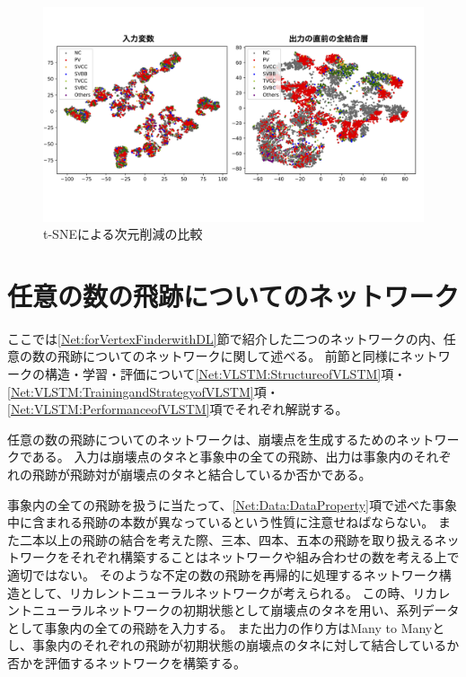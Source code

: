 \begin{figure}[htbp]
 \centering
 \includegraphics[width=1.0\textwidth]{Figure/3Networks/3-3-3-3tSNE.png}
 \caption{t-SNEによる次元削減の比較}
 \label{3-3-3-3tSNE}
\end{figure}



\section{任意の数の飛跡についてのネットワーク} \label{Net:VertexLSTM}

ここでは\ref{Net:forVertexFinderwithDL}節で紹介した二つのネットワークの内、任意の数の飛跡についてのネットワークに関して述べる。
前節と同様にネットワークの構造・学習・評価について\ref{Net:VLSTM:StructureofVLSTM}項・\ref{Net:VLSTM:TrainingandStrategyofVLSTM}項・\ref{Net:VLSTM:PerformanceofVLSTM}項でそれぞれ解説する。

任意の数の飛跡についてのネットワークは、崩壊点を生成するためのネットワークである。
入力は崩壊点のタネと事象中の全ての飛跡、出力は事象内のそれぞれの飛跡が飛跡対が崩壊点のタネと結合しているか否かである。

事象内の全ての飛跡を扱うに当たって、\ref{Net:Data:DataProperty}項で述べた事象中に含まれる飛跡の本数が異なっているという性質に注意せねばならない。
また二本以上の飛跡の結合を考えた際、三本、四本、五本の飛跡を取り扱えるネットワークをそれぞれ構築することはネットワークや組み合わせの数を考える上で適切ではない。
そのような不定の数の飛跡を再帰的に処理するネットワーク構造として、リカレントニューラルネットワークが考えられる。
この時、リカレントニューラルネットワークの初期状態として崩壊点のタネを用い、系列データとして事象内の全ての飛跡を入力する。
また出力の作り方はMany to Manyとし、事象内のそれぞれの飛跡が初期状態の崩壊点のタネに対して結合しているか否かを評価するネットワークを構築する。

